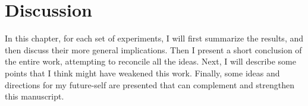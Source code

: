 \chapter{Discussion}
\label{ch:discussion}
In this chapter, for each set of experiments, I will first summarize the results, and then discuss their more general implications.
Then I present a short conclusion of the entire work, attempting to reconcile all the ideas.
Next, I will describe some points that I think might have weakened this work.
Finally, some ideas and directions for my future-self are presented that can complement and strengthen this manuscript.





